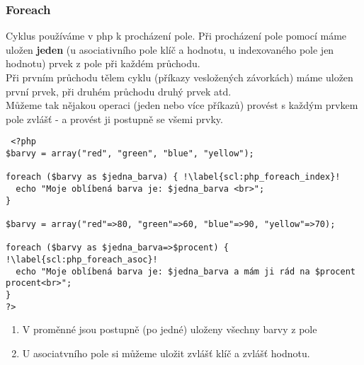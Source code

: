 \subsubsection{Foreach}
Cyklus  používáme v php k procházení pole.
Při procházení pole pomocí  máme uložen \textbf{jeden} (u asociativního pole klíč a hodnotu, u indexovaného pole jen hodnotu) prvek z pole při každém průchodu.\\
Při prvním průchodu tělem cyklu (příkazy vesložených závorkách) máme uložen první prvek, při druhém průchodu druhý prvek atd.\\
Můžeme tak nějakou operaci (jeden nebo více příkazů) provést s každým prvkem pole zvlášť - a provést ji postupně se všemi prvky.\\
\begin{minipage}[t]{.45\textwidth}
\begin{code}
\begin{verbatim}
 <?php
$barvy = array("red", "green", "blue", "yellow");

foreach ($barvy as $jedna_barva) { !\label{scl:php_foreach_index}!
  echo "Moje oblíbená barva je: $jedna_barva <br>";
}

$barvy = array("red"=>80, "green"=>60, "blue"=>90, "yellow"=>70);

foreach ($barvy as $jedna_barva=>$procent) { !\label{scl:php_foreach_asoc}!
  echo "Moje oblíbená barva je: $jedna_barva a mám ji rád na $procent procent<br>";
}
?> 
\end{verbatim}

\label{code:php_foreach}
\end{code}
\end{minipage}
\begin{minipage}[t]{.45\textwidth}
\begin{enumerate}
\vspace{4.5cm}
\item[ř. \ref{scl:php_foreach_index}:] V proměnné  jsou postupně (po jedné) uloženy všechny barvy z pole  
\item[ř. \ref{scl:php_foreach_asoc}:] U asociatvního pole si můžeme uložit zvlášť klíč a zvlášť hodnotu.
\end{enumerate}
\end{minipage}\\

